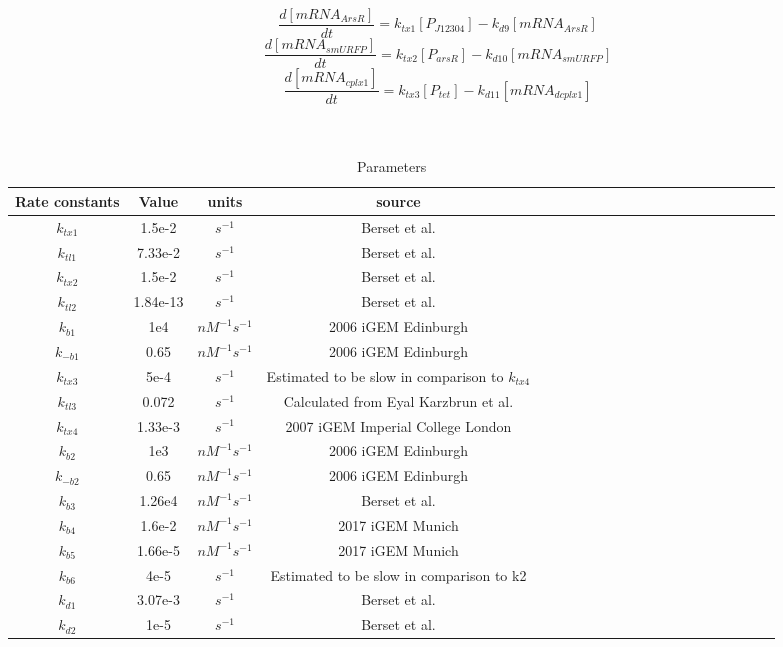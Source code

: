 \begin{equation}
	\frac{d[mRNA_{ArsR}]}{dt}=k_{tx1}[P_{J12304}]-k_{d9}[mRNA_{ArsR}] \tag{13}
\end{equation}
\begin{equation}
	\frac{d[mRNA_{smURFP}]}{dt}=k_{tx2}[P_{arsR}]-k_{d10}[mRNA_{smURFP}] \tag{14}
\end{equation}
\begin{equation}
	\frac{d[mRNA_{cplx1}]}{dt}=k_{tx3}[P_{tet}]-k_{d11}[mRNA_{dcplx1}] \tag{15}
\end{equation}
\\\\
\begin{table}[htbp]
	\centering
	\caption{\label {tab:test} Parameters}
	\begin{tabular}{ccccccccccccccccccccc}
		\toprule
		Rate constants & Value& units & source \\
		\midrule
		$k_{tx1}$ & 1.5e-2&$s^{-1} $& Berset et al. \\
		$k_{tl1}$ & 7.33e-2 &$s^{-1} $& Berset et al.\\
		$k_{tx2}$ & 1.5e-2 & $s^{-1}$ & Berset et al.\\
		$k_{tl2} $&1.84e-13&$s^{-1}$& Berset et al.\\
		$k_{b1} $& 1e4   & $nM^{-1}s^{-1}$ &2006 iGEM Edinburgh  \\
		$k_{-b1}$ & 0.65    & $nM^{-1}s^{-1}$ &2006 iGEM Edinburgh   \\
		$k_{tx3}$& 5e-4 &$s^{-1}$&Estimated to be slow in comparison to $k_{tx4} $\\
		$k_{tl3} $& 0.072   & $s^{-1}$ & Calculated from Eyal Karzbrun et al.  \\
		$k_{tx4} $& 1.33e-3 &$s^{-1}$&2007 iGEM Imperial College London \\
		$k_{b2} $& 1e3   & $nM^{-1}s^{-1}$ &2006 iGEM Edinburgh  \\
		$k_{-b2} $& 0.65    & $nM^{-1}s^{-1}$ &2006 iGEM Edinburgh   \\
		$k_{b3}  $&1.26e4 &$nM^{-1}s^{-1}$ & Berset et al. \\
		$k_{b4}$&1.6e-2& $nM^{-1}s^{-1}$& 2017 iGEM Munich\\
		$k_{b5} $&1.66e-5&$nM^{-1}s^{-1}$&  2017 iGEM Munich\\ 
		$k_{b6}$&4e-5&$s^{-1} $& Estimated to be slow in comparison to k2 \\
		$k_{d1} $& 3.07e-3&$s^{-1} $ & Berset et al.\\
		$k_{d2}$&1e-5&$s^{-1} $ & Berset et al.\\

\end{tabular}
\end{table}
